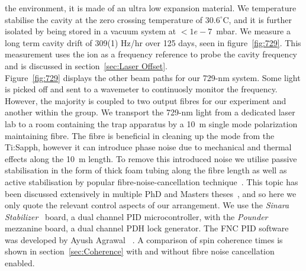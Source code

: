     the environment, it is made of an ultra low expansion material. We
    temperature stabilise the cavity at the zero crossing temperature of
    $30.6^\circ$C, and it is further isolated by being stored in a vacuum system
    at $<1e-7$~mbar. We measure a long term cavity drift of 309(1) Hz/hr over
    125 days, seen in figure~\ref{fig:729}. This measurement uses the ion as a
    frequency reference to probe the cavity frequency and is discussed in
    section~\ref{sec:Laser Offset}.\\
    Figure~\ref{fig:729} displays the other beam paths for our 729-nm system.
    Some light is picked off and sent to a wavemeter to continuosly monitor the
    frequency. However, the majority is coupled to two output fibres for our
    experiment and another within the group. We transport the 729-nm light from
    a dedicated laser lab to a room containing the trap apparatus by a 10~m
    single mode polarization maintaining fibre.  The fibre is
    beneficial in cleaning up the mode from the Ti:Sapph, however it can
    introduce phase noise due to mechanical and thermal effects along the 10~m
    length. To remove this introduced noise we utilise passive stabilisation in
    the form of thick foam tubing along the fibre length as well as active
    stabilisation by popular fibre-noise-cancellation technique~\cite{XXX}. This
    topic has been discussed extensively in multiple PhD and Masters
    theses~\cite{XXX}, and so here we only quote the relevant control aspects of
    our arrangement. We use the \emph{Sinara Stabilizer}~\cite{XXX} board, a
    dual channel PID microcontroller, with the \emph{Pounder}~\cite{XXX}
    mezzanine board, a dual channel PDH lock generator. The FNC PID software was
    developed by Ayush Agrawal ~\cite{XXX}. A comparison of spin coherence times
    is shown in section~\ref{sec:Coherence} with and without fibre noise
    cancellation enabled. \\


